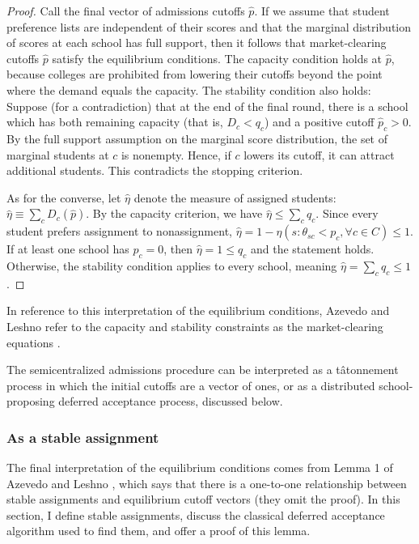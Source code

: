 \documentclass[12pt]{article}
\theoremstyle{definition}
\begin{document}
\begin{proof}Call the final vector of admissions cutoffs $\hat p$. If we assume that student preference lists are independent of their scores and that the marginal distribution of scores at each school has full support, then it follows that market-clearing cutoffs $\hat p$ satisfy the equilibrium conditions. The capacity condition holds at $\hat p$, because colleges are prohibited from lowering their cutoffs beyond the point where the demand equals the capacity. The stability condition also holds: Suppose (for a contradiction) that at the end of the final round, there is a school which has both remaining capacity (that is, $D_c < q_c$) and a positive cutoff $\hat p_c > 0$. By the full support assumption on the marginal score distribution, the set of marginal students at $c$ is nonempty. Hence, if $c$ lowers its cutoff, it can attract additional students. This contradicts the stopping criterion.

As for the converse, let $\hat \eta$ denote the measure of assigned students: $\hat \eta \equiv \sum_c D_c(\hat p)$. By the capacity criterion, we have $\hat \eta \leq \sum_c q_c$. Since every student prefers assignment to nonassignment, $\hat \eta = 1 - \eta ( s: \theta_{sc} < p_c, \forall c \in C) \leq 1$. If at least one school has $p_c = 0$, then $\hat \eta = 1 \leq q_c$ and the statement holds. Otherwise, the stability condition applies to every school, meaning $\hat \eta = \sum_c q_c \leq 1$ . 
\end{proof}

In reference to this interpretation of the equilibrium conditions, Azevedo and Leshno \parencite*{supplydemandfw} refer to the capacity and stability constraints as the market-clearing equations . 

The semicentralized admissions procedure can be interpreted as a t\^{a}tonnement process in which the initial cutoffs are a vector of ones, or as a distributed school-proposing deferred acceptance process, discussed below.

\subsubsection{As a stable assignment}
The final interpretation of the equilibrium conditions comes from Lemma 1 of Azevedo and Leshno \parencite*{supplydemandfw}, which says that there is a one-to-one relationship between stable assignments and equilibrium cutoff vectors (they omit the proof). In this section, I define stable assignments, discuss the classical deferred acceptance algorithm used to find them, and offer a proof of this lemma. 
\end{document}
